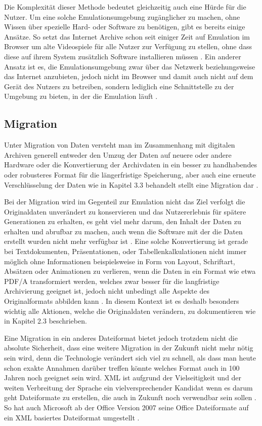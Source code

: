 \documentclass[conference,compsoc,final,a4paper]{IEEEtran}
\begin{document}
Die Komplexität dieser Methode bedeutet gleichzeitig auch eine Hürde für die Nutzer. Um eine solche Emulationsumgebung zugänglicher zu machen, ohne Wissen über spezielle Hard- oder Software zu benötigen, gibt es bereits einige Ansätze. So setzt das Internet Archive schon seit einiger Zeit auf Emulation im Browser um alte Videospiele für alle Nutzer zur Verfügung zu stellen, ohne dass diese auf ihrem System zusätzlich Software installieren müssen \autocite{IAEmulator}. Ein anderer Ansatz ist es, die Emulationsumgebung zwar über das Netzwerk beziehungsweise das Internet anzubieten, jedoch nicht im Browser und damit auch nicht auf dem Gerät des Nutzers zu betreiben, sondern lediglich eine Schnittstelle zu der Umgebung zu bieten, in der die Emulation läuft \autocite{Rechert2010}.

\subsection{Migration}
Unter Migration von Daten versteht man im Zusammenhang mit digitalen Archiven generell entweder den Umzug der Daten auf neuere oder andere Hardware oder die Konvertierung der Archivdaten in ein besser zu handhabendes oder robusteres Format für die längerfristige Speicherung, aber auch eine erneute Verschlüsselung der Daten wie in Kapitel 3.3 behandelt stellt eine Migration dar \autocite{Factor2009}.

Bei der Migration wird im Gegenteil zur Emulation nicht das Ziel verfolgt die Originaldaten unverändert zu konservieren und das Nutzererlebnis für spätere Generationen zu erhalten, es geht viel mehr darum, den Inhalt der Daten zu erhalten und abrufbar zu machen, auch wenn die Software mit der die Daten erstellt wurden nicht mehr verfügbar ist \autocite{Lee2002}. Eine solche Konvertierung ist gerade bei Textdokumenten, Präsentationen, oder Tabellenkalkulationen nicht immer möglich ohne Informationen beispielsweise in Form von Layout, Schriftart, Absätzen oder Animationen zu verlieren, wenn die Daten in ein Format wie etwa \acs{PDF}/A transformiert werden, welches zwar besser für die langfristige Archivierung geeignet ist, jedoch nicht unbedingt alle Aspekte des Originalformats abbilden kann \autocite{Reichherzer2006}. In diesem Kontext ist es deshalb besonders wichtig alle Aktionen, welche die Originaldaten verändern, zu dokumentieren wie in Kapitel 2.3 beschrieben.

Eine Migration in ein anderes Dateiformat bietet jedoch trotzdem nicht die absolute Sicherheit, dass eine weitere Migration in der Zukunft nicht mehr nötig sein wird, denn die Technologie verändert sich viel zu schnell, als dass man heute schon exakte Annahmen darüber treffen könnte welches Format auch in 100 Jahren noch geeignet sein wird. \ac{XML} ist aufgrund der Vielseitigkeit und der weiten Verbreitung der Sprache ein vielversprechender Kandidat wenn es darum geht Dateiformate zu erstellen, die auch in Zukunft noch verwendbar sein sollen \autocite{Lee2002}. So hat auch Microsoft ab der Office Version 2007 seine Office Dateiformate auf ein \acs{XML} basiertes Dateiformat umgestellt \autocite{MSOpenXML}.
\end{document}
